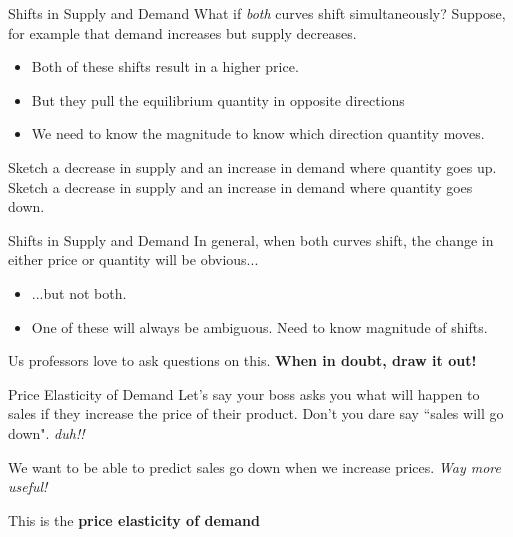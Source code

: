 \documentclass[12pt,t]{beamer}
\begin{document}
\begin{frame}{Shifts in Supply and Demand}
  What if \textit{both} curves shift simultaneously? Suppose, for example that demand increases but supply decreases.

  \begin{itemize}
    \item Both of these shifts result in a higher price.

    \item But they pull the equilibrium quantity in opposite directions

    \item We need to know the magnitude to know which direction quantity moves.
  \end{itemize}
\end{frame}

\begin{frame}

  \bigskip
  Sketch a decrease in supply and an increase in demand where quantity goes up.
  Sketch a decrease in supply and an increase in demand where quantity goes down.
\end{frame}

\begin{frame}{Shifts in Supply and Demand}
  In general, when both curves shift, the change in either price or quantity will be obvious...

  \begin{itemize}
    \item ...but not both.

    \item One of these will always be ambiguous. Need to know magnitude of shifts.
  \end{itemize}

  \pause\bigskip
  Us professors love to ask questions on this. \textbf{When in doubt, draw it out!}
\end{frame}

\begin{frame}{Price Elasticity of Demand}
  Let's say your boss asks you what will happen to sales if they increase the price of their product. Don't you dare say ``sales will go down". 
  \emph{duh!!}

  \pause\bigskip
  We want to be able to predict  sales go down when we increase prices. \emph{Way more useful!}

  \pause\bigskip
  This is the \textbf{price elasticity of demand}
\end{frame}
\end{document}
